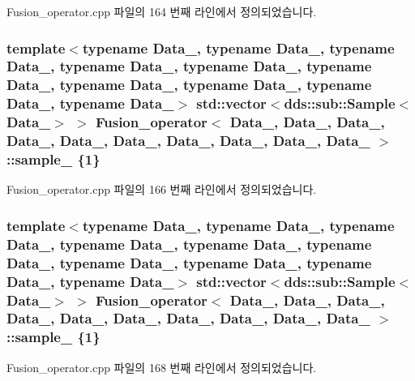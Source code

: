 Fusion\+\_\+operator.\+cpp 파일의 164 번째 라인에서 정의되었습니다.

\subsubsection[{\texorpdfstring{sample\+\_\+3}{sample_3}}]{\setlength{\rightskip}{0pt plus 5cm}template$<$typename Data\+\_, typename Data\+\_, typename Data\+\_, typename Data\+\_, typename Data\+\_, typename Data\+\_, typename Data\+\_, typename Data\+\_, typename Data\+\_, typename Data\+\_$>$ std\+::vector$<$dds\+::sub\+::\+Sample$<$Data\+\_$>$ $>$ {\bf Fusion\+\_\+operator}$<$ Data\+\_, Data\+\_, Data\+\_, Data\+\_, Data\+\_, Data\+\_, Data\+\_, Data\+\_, Data\+\_, Data\+\_ $>$\+::sample\+\_ \{1\}}\hypertarget{classFusion__operator_a1954d8d67f9a34d47e5b59cc65d09252}{}\label{classFusion__operator_a1954d8d67f9a34d47e5b59cc65d09252}


Fusion\+\_\+operator.\+cpp 파일의 166 번째 라인에서 정의되었습니다.

\subsubsection[{\texorpdfstring{sample\+\_\+4}{sample_4}}]{\setlength{\rightskip}{0pt plus 5cm}template$<$typename Data\+\_, typename Data\+\_, typename Data\+\_, typename Data\+\_, typename Data\+\_, typename Data\+\_, typename Data\+\_, typename Data\+\_, typename Data\+\_, typename Data\+\_$>$ std\+::vector$<$dds\+::sub\+::\+Sample$<$Data\+\_$>$ $>$ {\bf Fusion\+\_\+operator}$<$ Data\+\_, Data\+\_, Data\+\_, Data\+\_, Data\+\_, Data\+\_, Data\+\_, Data\+\_, Data\+\_, Data\+\_ $>$\+::sample\+\_ \{1\}}\hypertarget{classFusion__operator_a56bb3464ca6d140acdf3560bb94a401b}{}\label{classFusion__operator_a56bb3464ca6d140acdf3560bb94a401b}


Fusion\+\_\+operator.\+cpp 파일의 168 번째 라인에서 정의되었습니다.

